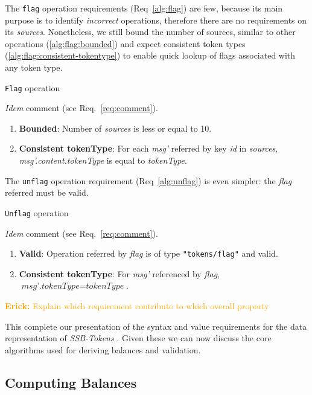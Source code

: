 \documentclass[sigplan,screen,10pt]{acmart}
\newcommand\el[1]{\textcolor{orange}{{\bf Erick: }#1}}
\newcommand\ssbtokens[0]{\textit{SSB-Tokens} }
\newcommand\idemcomment[0]{
\begin{flushleft}
{\color{commentgray} \textit{Idem} comment (see Req.~\ref{req:comment}).}
\end{flushleft}}
\begin{document}
The \texttt{flag} operation requirements (Req~\ref{alg:flag}) are few, because its main purpose is to identify \textit{incorrect} operations, therefore there are no requirements on its \textit{sources}. Nonetheless, we still bound the number of sources, similar to other operations (\ref{alg:flag:bounded}) and expect consistent token types (\ref{alg:flag:consistent-tokentype}) to enable quick lookup of flags associated with any token type. 

\begin{invariants}
    \caption{\texttt{Flag} operation}
    \label{alg:flag}
    \idemcomment
    \begin{enumerate}[label={F\arabic*},leftmargin=*]
        \item \textbf{Bounded}: Number of \textit{sources} is less or equal to 10. \label{alg:flag:bounded}
        \item \textbf{Consistent tokenType}: For each \textit{msg'} referred by key \textit{id} in \textit{sources}, \textit{msg'.content.tokenType} is equal to \textit{tokenType}. \label{alg:flag:consistent-tokentype}
    \end{enumerate}
\end{invariants}

The \texttt{unflag} operation requirement (Req~\ref{alg:unflag}) is even simpler: the \textit{flag} referred must be valid.

\begin{invariants}
   \caption{\texttt{Unflag} operation}
   \label{alg:unflag}
   \idemcomment
    \begin{enumerate}[label={U\arabic*},leftmargin=*]
        \item \textbf{Valid}: Operation referred by \textit{flag} is of type \texttt{"tokens/flag"} and valid. \label{alg:unflag:valid}
        \item \textbf{Consistent tokenType}: For \textit{msg'} referenced by \textit{flag}, $\textit{msg'.tokenType} = \textit{tokenType}$. \label{alg:flag:consistent-tokentype}
    \end{enumerate}
\end{invariants}

\el{Explain which requirement contribute to which overall property}

This complete our presentation of the syntax and value requirements for the data representation of \ssbtokens. Given these we can now discuss the core algorithms used for deriving balances and validation.

\subsection{Computing Balances}
\label{section:balances}
\end{document}
